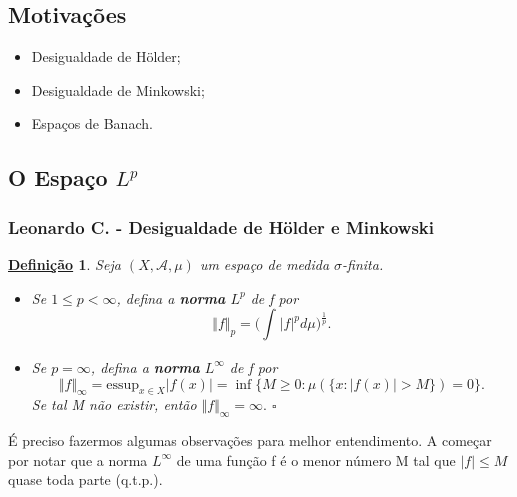 \documentclass{article}
\newtheorem*{def*}{\underline{Defini\c c\~ao}}
\begin{document}
\subsection{Motivações} 
\begin{itemize}
  \item Desigualdade de Hölder;
  \item Desigualdade de Minkowski;
  \item Espaços de Banach.
\end{itemize}
\subsection{O Espaço \(L^{p}\)}
\subsubsection*{Leonardo C. - Desigualdade de Hölder e Minkowski}
 \begin{def*}
   Seja \((X, \mathcal{A}, \mu )\) um espaço de medida \(\sigma \)-finita. 
  \begin{itemize}
    \item[i)] Se \(1\leq p<\infty\), defina a \textbf{norma }\(L^{p}\) de f por 
      \[
        \Vert f \Vert_{p}=\biggl(\int_{}^{}|f|^{p}d\mu \biggr)^{\frac{1}{p}}.
      \]
    \item[2)] Se \(p=\infty\), defina a \textbf{norma }\(L^{\infty}\) de f por 
      \[
        \Vert f \Vert_{\infty}=\mathrm{essup}_{x\in X}|f(x)| = \inf_{}\{M\geq 0: \mu (\{x:|f(x)|>M\})=0\}.
      \]
      Se tal M não existir, então \(\Vert f \Vert_{\infty} = \infty.\) \(\square\)
  \end{itemize}
 \end{def*}
 É preciso fazermos algumas observações para melhor entendimento. A começar por notar que a norma \(L^{\infty}\) de uma função f é o menor número M tal que \(|f|\leq M\) quase toda parte (q.t.p.). 
\end{document}
